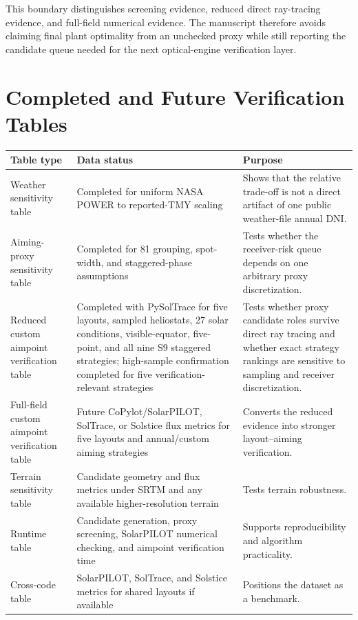 \documentclass[final,3p,times]{elsarticle}
\begin{document}
This boundary distinguishes screening evidence, reduced direct ray-tracing evidence, and full-field numerical evidence. The manuscript therefore avoids claiming final plant optimality from an unchecked proxy while still reporting the candidate queue needed for the next optical-engine verification layer.

\section{Completed and Future Verification Tables}
\begin{longtable}{p{}p{}p{}}
\toprule
Table type & Data status & Purpose \\
\midrule
Weather sensitivity table & Completed for uniform NASA POWER to reported-TMY scaling & Shows that the relative trade-off is not a direct artifact of one public weather-file annual DNI. \\
Aiming-proxy sensitivity table & Completed for 81 grouping, spot-width, and staggered-phase assumptions & Tests whether the receiver-risk queue depends on one arbitrary proxy discretization. \\
Reduced custom aimpoint verification table & Completed with PySolTrace for five layouts, sampled heliostats, 27 solar conditions, visible-equator, five-point, and all nine S9 staggered strategies; high-sample confirmation completed for five verification-relevant strategies & Tests whether proxy candidate roles survive direct ray tracing and whether exact strategy rankings are sensitive to sampling and receiver discretization. \\
Full-field custom aimpoint verification table & Future CoPylot/SolarPILOT, SolTrace, or Solstice flux metrics for five layouts and annual/custom aiming strategies & Converts the reduced evidence into stronger layout--aiming verification. \\
Terrain sensitivity table & Candidate geometry and flux metrics under SRTM and any available higher-resolution terrain & Tests terrain robustness. \\
Runtime table & Candidate generation, proxy screening, SolarPILOT numerical checking, and aimpoint verification time & Supports reproducibility and algorithm practicality. \\
Cross-code table & SolarPILOT, SolTrace, and Solstice metrics for shared layouts if available & Positions the dataset as a benchmark. \\
\bottomrule
\end{longtable}


\end{document}

